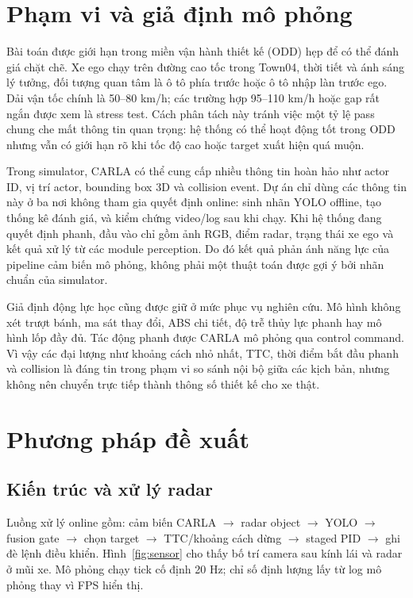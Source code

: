\documentclass[conference]{IEEEtran}
\begin{document}
\section{Phạm vi và giả định mô phỏng}
Bài toán được giới hạn trong miền vận hành thiết kế (ODD) hẹp để có thể đánh giá chặt chẽ. Xe ego chạy trên đường cao tốc trong Town04, thời tiết và ánh sáng lý tưởng, đối tượng quan tâm là ô tô phía trước hoặc ô tô nhập làn trước ego. Dải vận tốc chính là 50--80 km/h; các trường hợp 95--110 km/h hoặc gap rất ngắn được xem là stress test. Cách phân tách này tránh việc một tỷ lệ pass chung che mất thông tin quan trọng: hệ thống có thể hoạt động tốt trong ODD nhưng vẫn có giới hạn rõ khi tốc độ cao hoặc target xuất hiện quá muộn.

Trong simulator, CARLA có thể cung cấp nhiều thông tin hoàn hảo như actor ID, vị trí actor, bounding box 3D và collision event. Dự án chỉ dùng các thông tin này ở ba nơi không tham gia quyết định online: sinh nhãn YOLO offline, tạo thống kê đánh giá, và kiểm chứng video/log sau khi chạy. Khi hệ thống đang quyết định phanh, đầu vào chỉ gồm ảnh RGB, điểm radar, trạng thái xe ego và kết quả xử lý từ các module perception. Do đó kết quả phản ánh năng lực của pipeline cảm biến mô phỏng, không phải một thuật toán được gợi ý bởi nhãn chuẩn của simulator.

Giả định động lực học cũng được giữ ở mức phục vụ nghiên cứu. Mô hình không xét trượt bánh, ma sát thay đổi, ABS chi tiết, độ trễ thủy lực phanh hay mô hình lốp đầy đủ. Tác động phanh được CARLA mô phỏng qua control command. Vì vậy các đại lượng như khoảng cách nhỏ nhất, TTC, thời điểm bắt đầu phanh và collision là đáng tin trong phạm vi so sánh nội bộ giữa các kịch bản, nhưng không nên chuyển trực tiếp thành thông số thiết kế cho xe thật.

\section{Phương pháp đề xuất}
\subsection{Kiến trúc và xử lý radar}
Luồng xử lý online gồm: cảm biến CARLA $\rightarrow$ radar object $\rightarrow$ YOLO $\rightarrow$ fusion gate $\rightarrow$ chọn target $\rightarrow$ TTC/khoảng cách dừng $\rightarrow$ staged PID $\rightarrow$ ghi đè lệnh điều khiển. Hình~\ref{fig:sensor} cho thấy bố trí camera sau kính lái và radar ở mũi xe. Mô phỏng chạy tick cố định 20 Hz; chỉ số định lượng lấy từ log mô phỏng thay vì FPS hiển thị.
\end{document}
